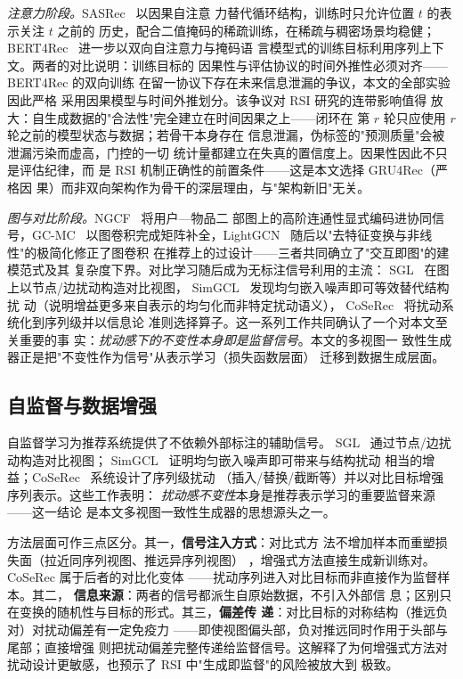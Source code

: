 \emph{注意力阶段。}SASRec~\cite{kang2018sasrec} 以因果自注意
力替代循环结构，训练时只允许位置 $t$ 的表示关注 $t$ 之前的
历史，配合二值掩码的稀疏训练，在稀疏与稠密场景均稳健；
BERT4Rec~\cite{sun2019bert4rec} 进一步以双向自注意力与掩码语
言模型式的训练目标利用序列上下文。两者的对比说明：训练目标的
因果性与评估协议的时间外推性必须对齐——BERT4Rec 的双向训练
在留一协议下存在未来信息泄漏的争议，本文的全部实验因此严格
采用因果模型与时间外推划分。该争议对 RSI 研究的连带影响值得
放大：自生成数据的"合法性"完全建立在时间因果之上——闭环在
第 $r$ 轮只应使用 $r$ 轮之前的模型状态与数据；若骨干本身存在
信息泄漏，伪标签的"预测质量"会被泄漏污染而虚高，门控的一切
统计量都建立在失真的置信度上。因果性因此不只是评估纪律，而
是 RSI 机制正确性的前置条件——这是本文选择 GRU4Rec（严格因
果）而非双向架构作为骨干的深层理由，与"架构新旧"无关。

\emph{图与对比阶段。}NGCF~\cite{wang2019ngcf} 将用户—物品二
部图上的高阶连通性显式编码进协同信号，GC-MC~\cite%
{berg2017graphconv} 以图卷积完成矩阵补全，LightGCN~\cite%
{he2020lightgcn} 随后以"去特征变换与非线性"的极简化修正了图卷积
在推荐上的过设计——三者共同确立了"交互即图"的建模范式及其
复杂度下界。对比学习随后成为无标注信号利用的主流：
SGL~\cite{xie2022sgl} 在图上以节点/边扰动构造对比视图，
SimGCL~\cite{yu2022simgcl} 发现均匀嵌入噪声即可等效替代结构扰
动（说明增益更多来自表示的均匀化而非特定扰动语义），
CoSeRec~\cite{liu2021coserec} 将扰动系统化到序列级并以信息论
准则选择算子。这一系列工作共同确认了一个对本文至关重要的事
实：\emph{扰动感下的不变性本身即是监督信号}。本文的多视图一
致性生成器正是把"不变性作为信号"从表示学习（损失函数层面）
迁移到数据生成层面。

\subsection{自监督与数据增强}
自监督学习为推荐系统提供了不依赖外部标注的辅助信号。
SGL~\cite{xie2022sgl} 通过节点/边扰动构造对比视图；
SimGCL~\cite{yu2022simgcl} 证明均匀嵌入噪声即可带来与结构扰动
相当的增益；CoSeRec~\cite{liu2021coserec} 系统设计了序列级扰动
（插入/替换/截断等）并以对比目标增强序列表示。这些工作表明：
\emph{扰动感不变性}本身是推荐表示学习的重要监督来源——这一结论
是本文多视图一致性生成器的思想源头之一。

方法层面可作三点区分。其一，\textbf{信号注入方式}：对比式方
法不增加样本而重塑损失面（拉近同序列视图、推远异序列视图）
，增强式方法直接生成新训练对。CoSeRec 属于后者的对比化变体
——扰动序列进入对比目标而非直接作为监督样本。其二，
\textbf{信息来源}：两者的信号都派生自原始数据，不引入外部信
息；区别只在变换的随机性与目标的形式。其三，\textbf{偏差传
递}：对比目标的对称结构（推远负对）对扰动偏差有一定免疫力
——即使视图偏头部，负对推远同时作用于头部与尾部；直接增强
则把扰动偏差完整传递给监督信号。这解释了为何增强式方法对
扰动设计更敏感，也预示了 RSI 中"生成即监督"的风险被放大到
极致。

